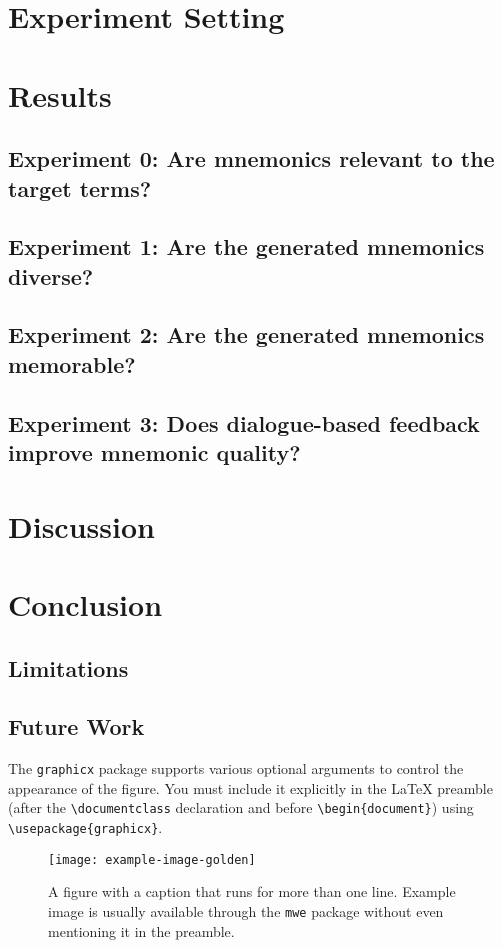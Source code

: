 \documentclass[11pt, onecolumn]{article}
\begin{document}
\section{Experiment Setting}
\section{Results}
\subsection{Experiment 0: Are mnemonics relevant to the target terms?}
\subsection{Experiment 1: Are the generated mnemonics diverse?}

\subsection{Experiment 2: Are the generated mnemonics memorable?}
\subsection{Experiment 3: Does dialogue-based feedback improve mnemonic quality?}

\section{Discussion}
\section{Conclusion}
\subsection{Limitations}
\subsection{Future Work}

The \verb|graphicx| package supports various optional arguments to control the
appearance of the figure.
You must include it explicitly in the \LaTeX{} preamble (after the
\verb|\documentclass| declaration and before \verb|\begin{document}|) using
\verb|\usepackage{graphicx}|.

\begin{figure}[t]
  \texttt{[image: example-image-golden]}
  \caption{A figure with a caption that runs for more than one line.
    Example image is usually available through the \texttt{mwe} package
    without even mentioning it in the preamble.}
  \label{fig:experiments}
\end{figure}
\end{document}
